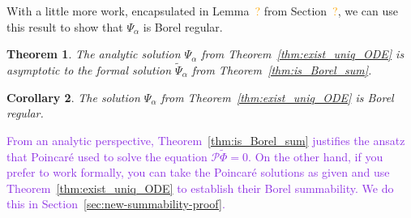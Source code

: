 \documentclass{article}
\newcommand{\dualsingexp}[2]{\widehat{\mathcal{H}}L^\infty_{#1, #2}}
\newcommand{\dualsingexpalg}[1]{\dualsingexp{#1}{\bullet}}
\newcommand{\C}{\mathbb{C}}
\newcommand{\series}[1]{\tilde{#1}}
\theoremstyle{definition}
\theoremstyle{plain}
\newtheorem{theorem}{Theorem}[section]
\newtheorem{corollary}[theorem]{Corollary}
\begin{document}
With a little more work, encapsulated in Lemma~\textcolor{orange}{?} from Section~\textcolor{orange}{?}, we can use this result to show that $\Psi_\alpha$ is Borel regular.
\begin{theorem}
The analytic solution $\Psi_\alpha$ from Theorem~\ref{thm:exist_uniq_ODE} is asymptotic to the formal solution $\series{\Psi}_\alpha$ from Theorem~\ref{thm:is_Borel_sum}.
\end{theorem}
\begin{corollary}
The solution $\Psi_\alpha$ from Theorem~\ref{thm:exist_uniq_ODE} is Borel regular.
\end{corollary}
\color{black}
\textcolor{BlueViolet}{From an analytic perspective, Theorem~\ref{thm:is_Borel_sum} justifies the ansatz that Poincar\'{e} used to solve the equation $\mathcal{P}\series{\Phi} = 0$. On the other hand, if you prefer to work formally, you can take the Poincar\'{e} solutions as given and use Theorem~\ref{thm:exist_uniq_ODE} to establish their Borel summability. We do this in Section~\ref{sec:new-summability-proof}.}
\end{document}
